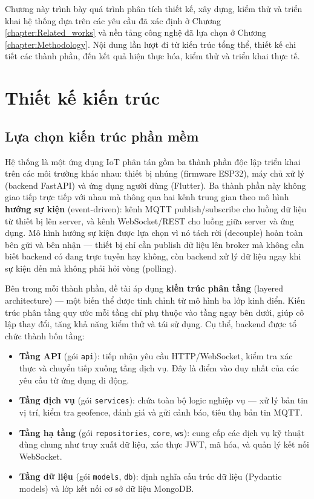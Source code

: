 \documentclass[../DoAn.tex]{subfiles}
\begin{document}
Chương này trình bày quá trình phân tích thiết kế, xây dựng, kiểm thử và triển khai hệ thống dựa trên các yêu cầu đã xác định ở Chương \ref{chapter:Related_works} và nền tảng công nghệ đã lựa chọn ở Chương \ref{chapter:Methodology}. Nội dung lần lượt đi từ kiến trúc tổng thể, thiết kế chi tiết các thành phần, đến kết quả hiện thực hóa, kiểm thử và triển khai thực tế.

\section{Thiết kế kiến trúc}

\subsection{Lựa chọn kiến trúc phần mềm}

Hệ thống là một ứng dụng IoT phân tán gồm ba thành phần độc lập triển khai trên các môi trường khác nhau: thiết bị nhúng (firmware ESP32), máy chủ xử lý (backend FastAPI) và ứng dụng người dùng (Flutter). Ba thành phần này không giao tiếp trực tiếp với nhau mà thông qua hai kênh trung gian theo mô hình \textbf{hướng sự kiện} (event-driven): kênh MQTT publish/subscribe cho luồng dữ liệu từ thiết bị lên server, và kênh WebSocket/REST cho luồng giữa server và ứng dụng. Mô hình hướng sự kiện được lựa chọn vì nó tách rời (decouple) hoàn toàn bên gửi và bên nhận — thiết bị chỉ cần publish dữ liệu lên broker mà không cần biết backend có đang trực tuyến hay không, còn backend xử lý dữ liệu ngay khi sự kiện đến mà không phải hỏi vòng (polling).

Bên trong mỗi thành phần, đề tài áp dụng \textbf{kiến trúc phân tầng} (layered architecture) — một biến thể được tinh chỉnh từ mô hình ba lớp kinh điển. Kiến trúc phân tầng quy ước mỗi tầng chỉ phụ thuộc vào tầng ngay bên dưới, giúp cô lập thay đổi, tăng khả năng kiểm thử và tái sử dụng. Cụ thể, backend được tổ chức thành bốn tầng:

\begin{itemize}
    \item \textbf{Tầng API} (gói \texttt{api}): tiếp nhận yêu cầu HTTP/WebSocket, kiểm tra xác thực và chuyển tiếp xuống tầng dịch vụ. Đây là điểm vào duy nhất của các yêu cầu từ ứng dụng di động.
    \item \textbf{Tầng dịch vụ} (gói \texttt{services}): chứa toàn bộ logic nghiệp vụ — xử lý bản tin vị trí, kiểm tra geofence, đánh giá và gửi cảnh báo, tiêu thụ bản tin MQTT.
    \item \textbf{Tầng hạ tầng} (gói \texttt{repositories}, \texttt{core}, \texttt{ws}): cung cấp các dịch vụ kỹ thuật dùng chung như truy xuất dữ liệu, xác thực JWT, mã hóa, và quản lý kết nối WebSocket.
    \item \textbf{Tầng dữ liệu} (gói \texttt{models}, \texttt{db}): định nghĩa cấu trúc dữ liệu (Pydantic models) và lớp kết nối cơ sở dữ liệu MongoDB.
\end{itemize}
\end{document}
